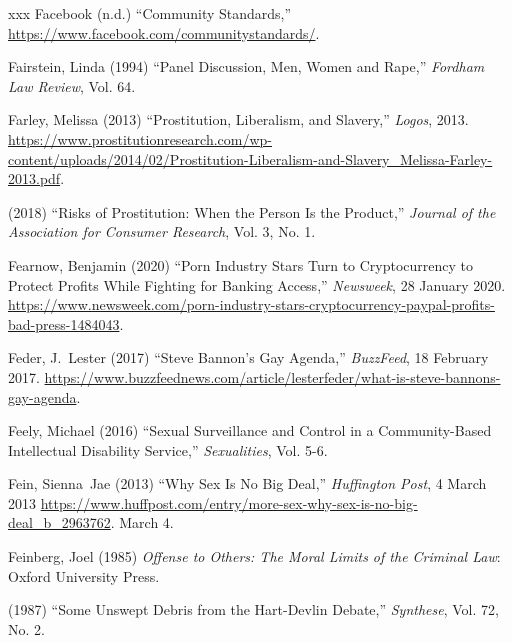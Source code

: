 \documentclass[]{jlreq} \usepackage{mystyle}
\begin{document}
\begin{thebibliography}{xxx}
Facebook (n.d.) ``Community Standards,''
  \url{https://www.facebook.com/communitystandards/}.

Fairstein, Linda (1994) ``Panel Discussion, Men, Women and Rape,'' \textit{
  Fordham Law Review}, Vol. 64.

Farley, Melissa (2013) ``Prostitution, Liberalism, and Slavery,'' \emph{Logos},
  2013.
  \url{https://www.prostitutionresearch.com/wp-content/uploads/2014/02/Prostitution-Liberalism-and-Slavery_Melissa-Farley-2013.pdf}.

 \bysame{}  (2018) ``Risks of Prostitution: When the Person Is the Product,''
  \textit{ Journal of the Association for Consumer Research}, Vol. 3, No. 1.

Fearnow, Benjamin (2020) ``Porn Industry Stars Turn to Cryptocurrency to
  Protect Profits While Fighting for Banking Access,'' \emph{Newsweek}, 28
  January 2020.
  \url{https://www.newsweek.com/porn-industry-stars-cryptocurrency-paypal-profits-bad-press-1484043}.

Feder, J.~Lester (2017) ``Steve Bannon's Gay Agenda,'' \emph{BuzzFeed}, 18
  February 2017.
  \url{https://www.buzzfeednews.com/article/lesterfeder/what-is-steve-bannons-gay-agenda}.

Feely, Michael (2016) ``Sexual Surveillance and Control in a Community-Based
  Intellectual Disability Service,'' \textit{ Sexualities}, Vol. 5-6.

Fein, Sienna~Jae (2013) ``Why Sex Is No Big Deal,'' \emph{Huffington Post}, 4
  March 2013
  \url{https://www.huffpost.com/entry/more-sex-why-sex-is-no-big-deal_b_2963762}.
  March 4.

Feinberg, Joel (1985)  \textit{ Offense to Others: The Moral Limits of the
  Criminal Law}: Oxford University Press.

 \bysame{}  (1987) ``Some Unswept Debris from the Hart-Devlin Debate,''
  \textit{ Synthese}, Vol. 72, No. 2.


\end{thebibliography}
\end{document}
